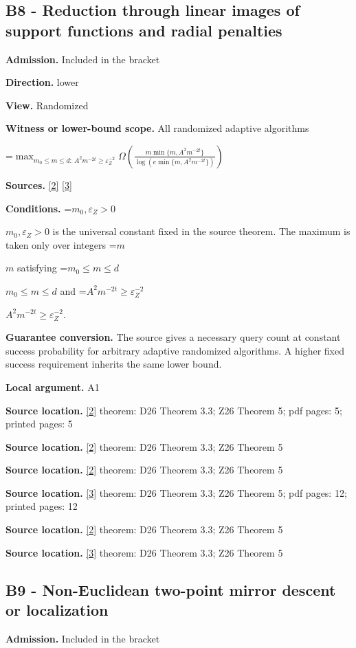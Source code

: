 \documentclass[10pt,a4paper]{article}
\newcommand{\AtlasMath}[1]{\par\begingroup\centering\setbox0=\hbox{$\displaystyle #1$}\ifdim\wd0>1.4\linewidth\typeout{ATLAS WIDE FORMULA: \the\wd0}\fi\ifdim\wd0>\linewidth\resizebox{\linewidth}{!}{\box0}\else\box0\fi\par\endgroup}
\newcommand{\AtlasInlineMath}[1]{\begingroup\setbox0=\hbox{$#1$}\ifdim\wd0>.4\linewidth\endgroup\AtlasMath{#1}\else\endgroup$#1$\fi}
\begin{document}
\subsection{B8 - Reduction through linear images of support functions and radial penalties}
\textbf{Admission.} Included in the bracket

\textbf{Direction.} lower

\textbf{View.} Randomized

\textbf{Witness or lower-bound scope.} All randomized adaptive algorithms

\AtlasMath{\max_{m_0\le m\le d:\ A^2m^{-2t}\ge\varepsilon_Z^{-2}}\Omega\!\left(\frac{m\min\{m,A^2m^{-2t}\}}{\log(e\min\{m,A^2m^{-2t}\})}\right)}
\textbf{Sources.} \href{https://arxiv.org/html/2610.00345v1}{[2]} \href{https://arxiv.org/html/2607.16558v2}{[3]}

\textbf{Conditions.} \AtlasInlineMath{m_0,\varepsilon_Z>0} is the universal constant fixed in the source theorem. The maximum is taken only over integers \AtlasInlineMath{m} satisfying \AtlasInlineMath{m_0\le m\le d} and \AtlasInlineMath{A^2m^{-2t}\ge\varepsilon_Z^{-2}}.

\textbf{Guarantee conversion.} The source gives a necessary query count at constant success probability for arbitrary adaptive randomized algorithms. A higher fixed success requirement inherits the same lower bound.

\textbf{Local argument.} A1

\textbf{Source location.} \href{https://arxiv.org/html/2610.00345v1}{[2]} theorem: D26 Theorem 3.3; Z26 Theorem 5; pdf pages: 5; printed pages: 5

\textbf{Source location.} \href{https://arxiv.org/html/2610.00345v1}{[2]} theorem: D26 Theorem 3.3; Z26 Theorem 5

\textbf{Source location.} \href{https://arxiv.org/html/2610.00345v1}{[2]} theorem: D26 Theorem 3.3; Z26 Theorem 5

\textbf{Source location.} \href{https://arxiv.org/html/2607.16558v2}{[3]} theorem: D26 Theorem 3.3; Z26 Theorem 5; pdf pages: 12; printed pages: 12

\textbf{Source location.} \href{https://arxiv.org/html/2610.00345v1}{[2]} theorem: D26 Theorem 3.3; Z26 Theorem 5

\textbf{Source location.} \href{https://arxiv.org/html/2607.16558v2}{[3]} theorem: D26 Theorem 3.3; Z26 Theorem 5

\subsection{B9 - Non-Euclidean two-point mirror descent or localization}
\textbf{Admission.} Included in the bracket
\end{document}
